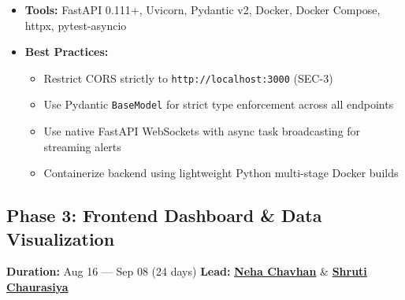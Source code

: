 \documentclass[11pt, a4paper]{article}
\newcommand{\goref}[2]{\hyperref[#1]{\textcolor{primary}{\textbf{#2}}}}
\begin{document}
\begin{toolbox}
\small
\begin{itemize}[nosep]
    \item \textbf{Tools:} FastAPI 0.111+, Uvicorn, Pydantic v2, Docker, Docker Compose, httpx, pytest-asyncio
    \item \textbf{Best Practices:}
    \begin{itemize}[nosep]
        \item Restrict CORS strictly to \texttt{http://localhost:3000} (SEC-3)
        \item Use Pydantic \texttt{BaseModel} for strict type enforcement across all endpoints
        \item Use native FastAPI WebSockets with async task broadcasting for streaming alerts
        \item Containerize backend using lightweight Python multi-stage Docker builds
    \end{itemize}
\end{itemize}
\end{toolbox}

\subsection{Phase 3: Frontend Dashboard \& Data Visualization}
\label{sec:phase3}
\textbf{Duration:} Aug 16 — Sep 08 (24 days) \hfill \textbf{Lead:} \goref{sec:team}{Neha Chavhan} \& \goref{sec:team}{Shruti Chaurasiya}
\end{document}

